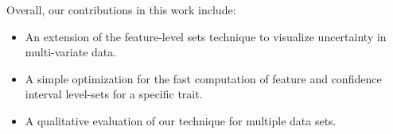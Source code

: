 Overall, our contributions in this work include:
\begin{itemize}
\item An extension of the feature-level sets technique to visualize uncertainty in multi-variate data.
\item A simple optimization for the fast computation of feature and confidence interval level-sets for a specific trait.
\item A qualitative evaluation of our technique for multiple data sets.
\end{itemize}
